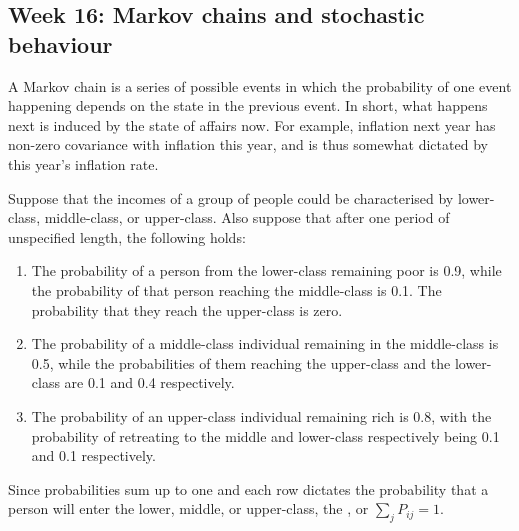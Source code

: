 \documentclass[a4paper, 12pt,oneside,openany]{book}
\begin{document}
\subsection{Week 16: Markov chains and stochastic behaviour}

A Markov chain is a series of possible events in which the probability of one event happening depends on the state in the previous event. In short, what happens next is induced by the state of affairs now. For example, inflation next year has non-zero covariance with inflation this year, and is thus somewhat dictated by this year's inflation rate.

Suppose that the incomes of a group of people could be characterised by lower-class, middle-class, or upper-class. Also suppose that after one period of unspecified length, the following holds:

\begin{enumerate}
	\item The probability of a person from the lower-class remaining poor is 0.9, while the probability of that person reaching the middle-class is 0.1. The probability that they reach the upper-class is zero.
	\item The probability of a middle-class individual remaining in the middle-class is 0.5, while the probabilities of  them reaching the upper-class and the lower-class are 0.1 and 0.4 respectively.
	\item The probability of an upper-class individual remaining rich is 0.8, with the probability of retreating to the middle and lower-class respectively being 0.1 and 0.1 respectively.
\end{enumerate}


Since probabilities sum up to one and each row dictates the probability that a person will enter the lower, middle, or upper-class, the , or $\sum_j P_{ij}=1$.
\end{document}
